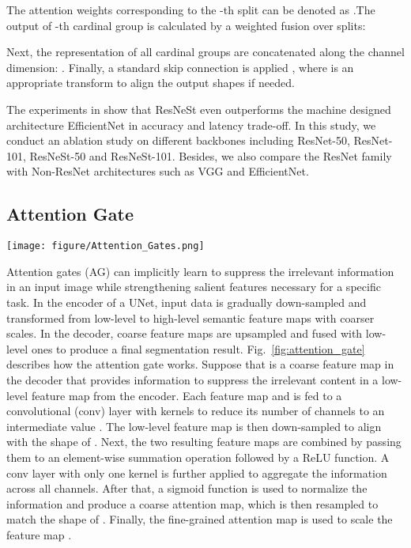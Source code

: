 \documentclass[review, sort&compress]{elsarticle}
\begin{document}
The attention weights corresponding to the -th split can be denoted as .The output of -th cardinal group  is calculated by a weighted fusion over splits:



Next, the representation of all cardinal groups are concatenated along the channel dimension: . Finally, a standard skip connection is applied , where  is an appropriate transform to align the output shapes if needed.

The experiments in \cite{zhang2020resnest} show that ResNeSt even outperforms the machine designed architecture EfficientNet \cite{tan2019efficientnet} in accuracy and latency trade-off. In this study, we conduct an ablation study on different backbones including ResNet-50, ResNet-101, ResNeSt-50 and ResNeSt-101. Besides, we also compare the ResNet family with Non-ResNet architectures such as VGG and EfficientNet.

\subsection{Attention Gate}
\begin{figure*}[ht!]
\texttt{[image: figure/Attention\_Gates.png]}
\caption{The Attention Gate (AG) receives two inputs: a low-level feature map  from an encoder and a coarse feature map  from a corresponding decoder. The feature map  is firstly down-sampled and fused with , then fed to some hidden layers to yield an attention coefficient map . Finally, the input features  are scaled with attention coefficients to suppress irrelevant information.}
\label{fig:attention_gate}
\end{figure*}

Attention gates (AG) \cite{oktay2018attention} can implicitly learn to suppress the irrelevant information in an input image while strengthening salient features necessary for a specific task. In the encoder of a UNet, input data is gradually down-sampled and transformed from low-level to high-level semantic feature maps with coarser scales. In the decoder, coarse feature maps are upsampled and fused with low-level ones to produce a final segmentation result. Fig.~\ref{fig:attention_gate} describes how the attention gate works. Suppose that  is a coarse feature map in the decoder that provides information to suppress the irrelevant content in a low-level feature map  from the encoder. Each feature map  and  is fed to a  convolutional (conv) layer with  kernels to reduce its number of channels to an intermediate value .
The low-level feature map is then down-sampled to align with the shape of . Next, the two resulting feature maps are combined by passing them to an element-wise summation operation followed by a ReLU function. A  conv layer with only one kernel is further applied to aggregate the information across all channels. After that, a sigmoid function is used to normalize the information and produce a coarse attention map, which is then resampled to match the shape of . Finally, the fine-grained attention map  is used to scale the feature map .
\end{document}
